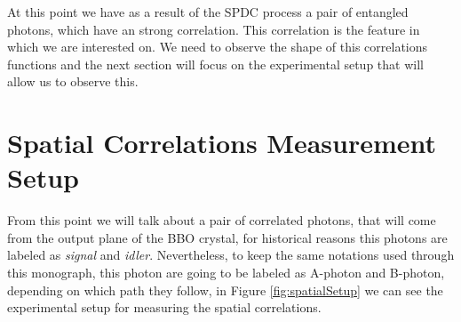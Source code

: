At this point we have as a result of the SPDC process a pair of entangled photons, which have an strong correlation. This correlation is 
the feature in which we are interested on. We need to observe the shape of this correlations functions and the next section will focus 
on the experimental setup that will allow us to observe this.



\section{Spatial Correlations Measurement Setup}
From this point we will talk about a pair of correlated photons, that will come from the output plane of the BBO 
crystal, for historical reasons this photons are labeled as \textit{signal} and \textit{idler}. Nevertheless, to keep the same notations used through 
this monograph, this photon are going to be labeled as A-photon and B-photon, depending on which path they follow, in Figure \ref{fig:spatialSetup}
we can see the experimental setup for measuring the spatial correlations.

